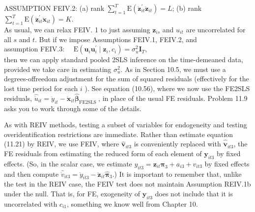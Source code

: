 \documentclass[10pt]{article}
\begin{document}
ASSUMPTION FEIV.2: (a) rank $\sum_{t=1}^{T} \mathrm{E}\left(\ddot{\mathbf{z}}_{i t}^{\prime} \ddot{\mathbf{z}}_{i t}\right)=L$; (b) rank $\sum_{t=1}^{T} \mathrm{E}\left(\ddot{\mathbf{z}}_{i t}^{\prime} \ddot{\mathbf{x}}_{i t}\right)=K$.\\
As usual, we can relax FEIV. 1 to just assuming $\mathbf{z}_{i s}$ and $u_{i t}$ are uncorrelated for all $s$ and $t$. But if we impose Assumptions FEIV.1, FEIV.2, and\\
assumption FEIV.3: $\quad \mathrm{E}\left(\mathbf{u}_{i} \mathbf{u}_{i}^{\prime} \mid \mathbf{z}_{i}, c_{i}\right)=\sigma_{u}^{2} \mathbf{I}_{T}$,\\
then we can apply standard pooled 2SLS inference on the time-demeaned data, provided we take care in estimating $\sigma_{u}^{2}$. As in Section 10.5, we must use a degrees-offreedom adjustment for the sum of squared residuals (effectively for the lost time period for each $i$ ). See equation (10.56), where we now use the FE2SLS residuals, $\hat{\ddot{u}}_{i t}=\ddot{y}_{i t}-\ddot{\mathbf{x}}_{i t} \hat{\boldsymbol{\beta}}_{\text {FE2SLS }}$, in place of the usual FE residuals. Problem 11.9 asks you to work through some of the details.

As with REIV methods, testing a subset of variables for endogeneity and testing overidentification restrictions are immediate. Rather than estimate equation (11.21) by REIV, we use FEIV, where $\hat{\mathbf{v}}_{i t 3}$ is conveniently replaced with $\hat{\ddot{\mathbf{v}}}_{i t 3}$, the FE residuals from estimating the reduced form of each element of $\mathbf{y}_{i t 3}$ by fixed effects. (So, in the scalar case, we estimate $y_{i t 3}=\mathbf{z}_{i t} \boldsymbol{\pi}_{3}+a_{i 3}+v_{i t 3}$ by fixed effects and then compute $\hat{\ddot{v}}_{i t 3}=\ddot{y}_{i t 3}-\ddot{\mathbf{z}}_{i t} \hat{\boldsymbol{\pi}}_{3}$.) It is important to remember that, unlike the test in the REIV case, the FEIV test does not maintain Assumption REIV.1b under the null. That is, for FE, exogeneity of $\mathbf{y}_{i t 3}$ does not include that it is uncorrelated with $c_{i 1}$, something we know well from Chapter 10.
\end{document}
